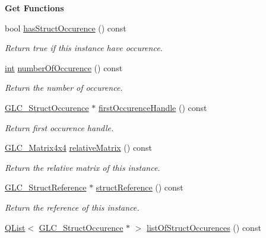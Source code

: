 \begin{Indent}{\bf Get Functions}\par
\begin{DoxyCompactItemize}
\item 
bool \hyperlink{class_g_l_c___struct_instance_a55fd30b91cd55b98a4ac75c1b23d4df6}{has\-Struct\-Occurence} () const 
\begin{DoxyCompactList}\small\item\em Return true if this instance have occurence. \end{DoxyCompactList}\item 
\hyperlink{ioapi_8h_a787fa3cf048117ba7123753c1e74fcd6}{int} \hyperlink{class_g_l_c___struct_instance_a858b9fd0630b55d04a567d5ac63a83aa}{number\-Of\-Occurence} () const 
\begin{DoxyCompactList}\small\item\em Return the number of occurence. \end{DoxyCompactList}\item 
\hyperlink{class_g_l_c___struct_occurence}{G\-L\-C\-\_\-\-Struct\-Occurence} $\ast$ \hyperlink{class_g_l_c___struct_instance_ab2b4d227aad1d72a13748c496049883d}{first\-Occurence\-Handle} () const 
\begin{DoxyCompactList}\small\item\em Return first occurence handle. \end{DoxyCompactList}\item 
\hyperlink{class_g_l_c___matrix4x4}{G\-L\-C\-\_\-\-Matrix4x4} \hyperlink{class_g_l_c___struct_instance_a3b98f6cc39e34875b38dff7ee894f834}{relative\-Matrix} () const 
\begin{DoxyCompactList}\small\item\em Return the relative matrix of this instance. \end{DoxyCompactList}\item 
\hyperlink{class_g_l_c___struct_reference}{G\-L\-C\-\_\-\-Struct\-Reference} $\ast$ \hyperlink{class_g_l_c___struct_instance_a9add43f75fab5d40c90614bc8263a4a5}{struct\-Reference} () const 
\begin{DoxyCompactList}\small\item\em Return the reference of this instance. \end{DoxyCompactList}\item 
\hyperlink{class_q_list}{Q\-List}$<$ \hyperlink{class_g_l_c___struct_occurence}{G\-L\-C\-\_\-\-Struct\-Occurence} $\ast$ $>$ \hyperlink{class_g_l_c___struct_instance_ac7b1a85fc4d2b963903680f3a2168083}{list\-Of\-Struct\-Occurences} () const 

\end{DoxyCompactItemize}
\end{Indent}

